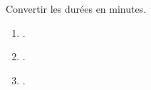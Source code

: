 \begin{exercice*}
   Convertir les durées en minutes.
   \begin{multicols}{3}
      \begin{enumerate}
         \item {}.
         \item {}.
         \item {}.
      \end{enumerate}
   \end{multicols}
\end{exercice*}
